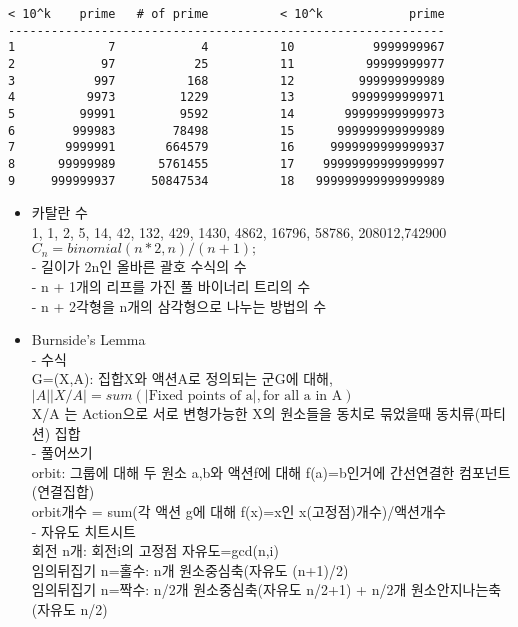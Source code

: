 \documentclass[landscape, 8pt, a4paper, oneside]{extarticle} %
\begin{document}
\begin{multicols*}{3}
\begin{verbatim}
< 10^k    prime   # of prime          < 10^k            prime
-------------------------------------------------------------
1             7            4          10           9999999967
2            97           25          11          99999999977
3           997          168          12         999999999989
4          9973         1229          13        9999999999971
5         99991         9592          14       99999999999973
6        999983        78498          15      999999999999989
7       9999991       664579          16     9999999999999937
8      99999989      5761455          17    99999999999999997
9     999999937     50847534          18   999999999999999989
\end{verbatim}

{}{}{}{}{}
\begin{itemize}
\setlength\itemsep{0.1em}
    
\item 카탈란 수\\
1, 1, 2, 5, 14, 42, 132, 429, 1430, 4862, 16796, 58786, 208012,742900\\
$C_n = binomial(n * 2, n) / (n + 1);$\\
- 길이가 2n인 올바른 괄호 수식의 수\\
- n + 1개의 리프를 가진 풀 바이너리 트리의 수\\
- n + 2각형을 n개의 삼각형으로 나누는 방법의 수

\item Burnside’s Lemma\\
- 수식\\
G=(X,A): 집합X와 액션A로 정의되는 군G에 대해, $\vert A\vert\vert X/A \vert=sum(\vert \text{Fixed points of a}\vert,\text{for all a in A})$\\
X/A 는 Action으로 서로 변형가능한 X의 원소들을 동치로 묶었을때 동치류(파티션) 집합\\
- 풀어쓰기\\
orbit: 그룹에 대해 두 원소 a,b와 액션f에 대해 f(a)=b인거에 간선연결한 컴포넌트(연결집합)\\
orbit개수 = sum(각 액션 g에 대해 f(x)=x인 x(고정점)개수)/액션개수\\
- 자유도 치트시트\\
회전 n개: 회전i의 고정점 자유도=gcd(n,i)\\
임의뒤집기 n=홀수: n개 원소중심축(자유도 (n+1)/2)\\
임의뒤집기 n=짝수: n/2개 원소중심축(자유도 n/2+1) + n/2개 원소안지나는축(자유도 n/2)


\end{itemize}
\end{multicols*}
\end{document}
